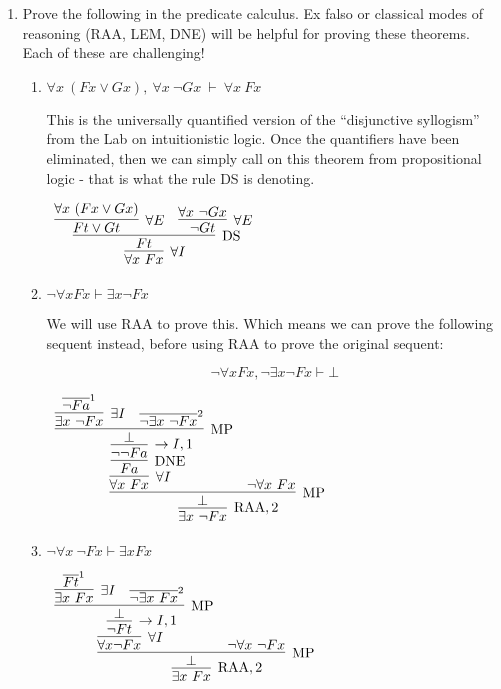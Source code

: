 \documentclass[11pt]{report}
\newcommand{\temp}[2]{{\overline{#2}}^{#1}}
\begin{document}
\begin{enumerate}
	\newpage
	\item Prove the following in the predicate calculus. Ex falso or classical modes of reasoning (RAA, LEM, DNE) will be helpful for proving these theorems. Each of these are challenging!

		\begin{enumerate}
			\item $\forall x \ (Fx \lor Gx), \ \forall x \ \lnot Gx \ \vdash \ \forall x \ Fx$
			
			This is the universally quantified version of the ``disjunctive syllogism'' from the Lab on intuitionistic logic. Once the quantifiers have been eliminated, then we can simply call on this theorem from propositional logic - that is what the rule DS is denoting. 

			\begin{center}
				$\begin{array}{c}
					\infer[\forall I]{\forall x \ Fx}
						{\infer[\DS]{Ft}
							{\infer[\forall E]{Ft \lor Gt}
								{\forall x \ (Fx \lor Gx)}
							&
							\infer[\forall E]{\lnot Gt}
								{\forall x \ \lnot Gx}}}
				\end{array}$
			\end{center}
			
			\item $ \neg \forall x Fx \vdash \exists x \neg Fx$
			
			We will use RAA to prove this. Which means we can prove the following sequent instead, before using RAA to prove the original sequent:
			
			$$ \neg \forall x Fx, \lnot\exists x \neg Fx \vdash \bot $$
			
			\begin{center}
				$\begin{array}{c}
					\infer[\RAA,2]{\exists x \ \lnot Fx}
						{\infer[\MP]{\bot}
							{\infer[\forall I]{\forall x \ Fx}
								{\infer[\DNE]{Fa}
									{\infer[\to I,1]{\lnot\lnot Fa}
										{\infer[\MP]{\bot}
											{\infer[\exists I]{\exists x \ \lnot Fx}
												{\temp{1}{\lnot Fa}}
											&
											\temp{2}{\lnot \exists x \ \lnot Fx}}}}}
							&
							\lnot \forall x \ Fx}}
				\end{array}$
			\end{center}
			
			\item $\lnot \forall x \ \lnot Fx \vdash \exists x Fx$
			
			\begin{center}
				$\begin{array}{c}
					\infer[\RAA,2]{\exists x \ Fx}
						{\infer[\MP]{\bot}
							{\infer[\forall I]{\forall x \lnot Fx}
								{\infer[\to I,1]{\lnot Ft}
									{\infer[\MP]{\bot}
										{\infer[\exists I]{\exists x \ Fx}
											{\temp{1}{Ft}}
										&
										\temp{2}{\lnot \exists x \ Fx}}}}
							&
							\lnot \forall x \ \lnot Fx}}
				\end{array}$
			\end{center}
			

\end{enumerate}
\end{enumerate}
\end{document}
